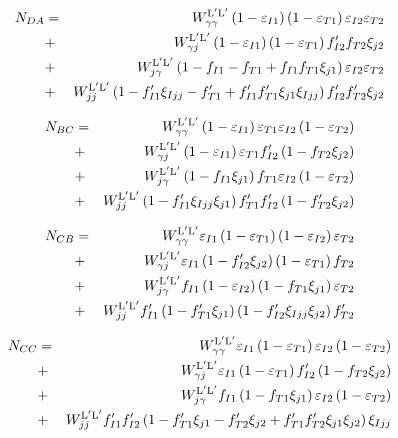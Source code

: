   \begin{eqnarray}
    N_{DA} &=& \WyyLL \left(1- \eIone\right)\left(1-\eTone\right)\eItwo \eTtwo \nonumber \\
    &+& \WyjLL  \left(1-\eIone\right)\left(1-\eTone\right)\fIptwo \fTtwo\xijtwo \nonumber \\
    &+& \WjyLL  \left(1-\fIone-\fTone  +\fIone \fTone  \xijone  \right) \eItwo \eTtwo\nonumber \\
    &+& \WjjLL\left(1- \fIpone\xiIjj-\fTpone+ \fIpone\fTpone\xijone\xiIjj\right)\fIptwo \fTptwo\xijtwo
  \end{eqnarray}
  
  \begin{eqnarray}
    N_{BC} &=& \WyyLL \left(1- \eIone\right) \eTone \eItwo \left(1- \eTtwo\right) \nonumber \\
    &+& \WyjLL\left(1-\eIone   \right)\eTone \fIptwo  \left(1-\fTtwo \xijtwo  \right)  \nonumber \\
    &+& \WjyLL \left(1-\fIone  \xijone\right) \fTone \eItwo\left(1-\eTtwo   \right)  \nonumber \\
    &+& \WjjLL\left(1-\fIpone\xiIjj\xijone\right) \fTpone \fIptwo \left(1-  \fTptwo\xijtwo\right)
  \end{eqnarray}
  
  \begin{eqnarray}
    N_{CB} &=& \WyyLL \eIone\left(1-  \eTone\right) \left(1- \eItwo\right) \eTtwo  \nonumber \\
    &+& \WyjLL\eIone\left(1-\fIptwo   \xijtwo\right) \left(1-\eTone \right) \fTtwo  \nonumber \\
    &+& \WjyLL \fIone \left(1-\eItwo   \right) \left(1-\fTone \xijone  \right)\eTtwo \nonumber \\
    &+& \WjjLL\fIpone \left(1- \fTpone \xijone\right) \left(1-\fIptwo\xiIjj \xijtwo\right) \fTptwo
  \end{eqnarray}
  
  \begin{eqnarray}
    N_{CC} &=& \WyyLL \eIone \left(1-\eTone\right)\eItwo\left(1-\eTtwo\right) \nonumber \\
    &+& \WyjLL\eIone\left(1-\eTone\right) \fIptwo   \left(1-\fTtwo \xijtwo\right) \nonumber \\
    &+& \WjyLL \fIone  \left(1-\fTone \xijone\right) \eItwo\left(1-\eTtwo\right) \nonumber \\
    &+& \WjjLL\fIpone\fIptwo\left(1-\fTpone\xijone-  \fTptwo\xijtwo+\fTpone \fTptwo\xijone\xijtwo\right)\xiIjj
  \end{eqnarray}
  
